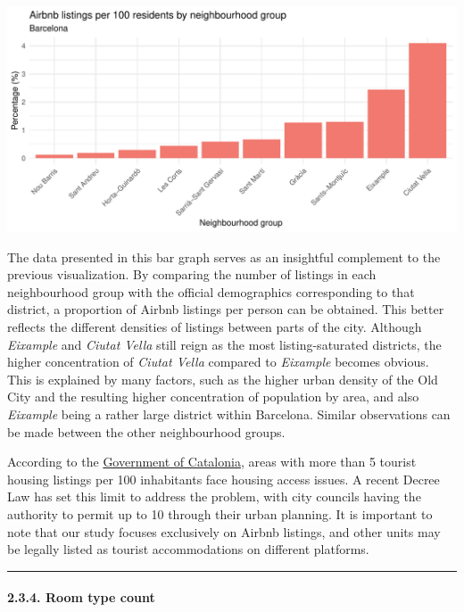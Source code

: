 \documentclass[
]{article}
\begin{document}
\begin{center}\includegraphics{Barcelona-AirBnB-Insights_files/figure-latex/plot3-1} \end{center}

The data presented in this bar graph serves as an insightful complement
to the previous visualization. By comparing the number of listings in
each neighbourhood group with the official demographics corresponding to
that district, a proportion of Airbnb listings per person can be
obtained. This better reflects the different densities of listings
between parts of the city. Although \emph{Eixample} and \emph{Ciutat
Vella} still reign as the most listing-saturated districts, the higher
concentration of \emph{Ciutat Vella} compared to \emph{Eixample} becomes
obvious. This is explained by many factors, such as the higher urban
density of the Old City and the resulting higher concentration of
population by area, and also \emph{Eixample} being a rather large
district within Barcelona. Similar observations can be made between the
other neighbourhood groups.

According to the
\href{https://web.gencat.cat/es/actualitat/detall/Regulacio-de-pisos-turistics-per-garantir-lacces-a-lhabitatge}{Government
of Catalonia}, areas with more than 5 tourist housing listings per 100
inhabitants face housing access issues. A recent Decree Law has set this
limit to address the problem, with city councils having the authority to
permit up to 10 through their urban planning. It is important to note
that our study focuses exclusively on Airbnb listings, and other units
may be legally listed as tourist accommodations on different platforms.

\begin{center}\rule{0.5\linewidth}{0.5pt}\end{center}

\hypertarget{room-type-count}{%
\paragraph{2.3.4. Room type count}\label{room-type-count}}
\end{document}
